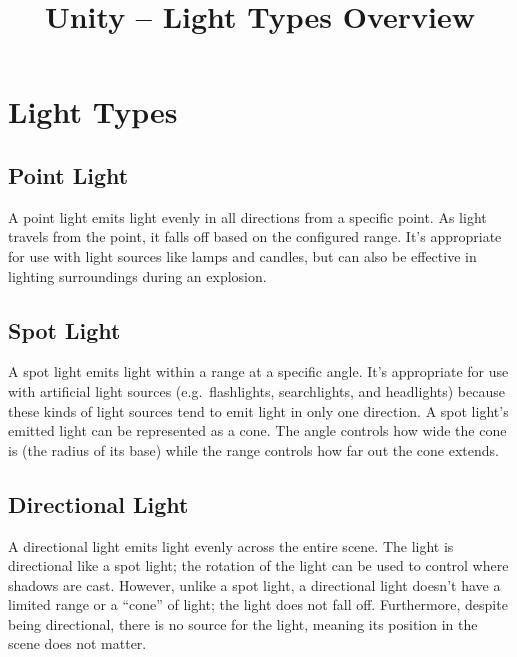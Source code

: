 \documentclass[a4paper, 12pt]{scrartcl}
\title{Unity -- Light Types Overview}
\begin{document}
\maketitle

\section{Light Types}
\subsection{Point Light}
A point light emits light evenly in all directions from a specific point. As light travels from the point, it falls off based on the configured range. It's appropriate for use with light sources like lamps and candles, but can also be effective in lighting surroundings during an explosion.

\begin{figure}[!htb]
  \centering
  
  \label{fig:point_light}
\end{figure}

\subsection{Spot Light}
A spot light emits light within a range at a specific angle. It's appropriate for use with artificial light sources (e.g.\ flashlights, searchlights, and headlights) because these kinds of light sources tend to emit light in only one direction. A spot light's emitted light can be represented as a cone. The angle controls how wide the cone is (the radius of its base) while the range controls how far out the cone extends.

\begin{figure}[!htb]
  \centering
  
  \label{fig:spot_light}
\end{figure}

\subsection{Directional Light}
A directional light emits light evenly across the entire scene. The light is directional like a spot light; the rotation of the light can be used to control where shadows are cast. However, unlike a spot light, a directional light doesn't have a limited range or a ``cone'' of light; the light does not fall off. Furthermore, despite being directional, there is no source for the light, meaning its position in the scene does not matter.
\end{document}
